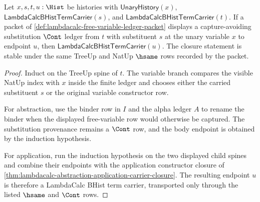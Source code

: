 \begin{theorem}
\label{thm:lambdacalc-capture-avoidance-cont-closure}
Let $x,s,t,u:\Hist$ be histories with $\mathsf{UnaryHistory}(x)$,
$\mathsf{LambdaCalcBHistTermCarrier}(s)$, and
$\mathsf{LambdaCalcBHistTermCarrier}(t)$. If a packet of
\autoref{def:lambdacalc-free-variable-ledger-packet} displays a
capture-avoiding substitution $\Cont$ ledger from $t$ with substituent $s$ at
the unary variable $x$ to endpoint $u$, then
$\mathsf{LambdaCalcBHistTermCarrier}(u)$. The closure statement is stable under
the same TreeUp and NatUp $\hsame$ rows recorded by the packet.
\end{theorem}
\begin{proof}
Induct on the TreeUp spine of $t$. The variable branch compares the visible
NatUp index with $x$ inside the finite ledger and chooses either the carried
substituent $s$ or the original variable constructor row.

For abstraction, use the binder row in $I$ and the alpha ledger $A$ to rename
the binder when the displayed free-variable row would otherwise be captured.
The substitution provenance remains a $\Cont$ row, and the body endpoint is
obtained by the induction hypothesis.

For application, run the induction hypothesis on the two displayed child
spines and combine their endpoints with the application constructor closure of
\autoref{thm:lambdacalc-abstraction-application-carrier-closure}. The resulting
endpoint $u$ is therefore a LambdaCalc BHist term carrier, transported only
through the listed $\hsame$ and $\Cont$ rows.
\end{proof}


